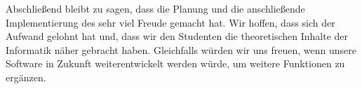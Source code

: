Abschließend bleibt zu sagen, dass die Planung und die anschließende
Implementierung des \gtitools sehr viel Freude gemacht hat. Wir hoffen, dass sich
der Aufwand gelohnt hat und, dass wir den Studenten die theoretischen Inhalte der
Informatik näher gebracht haben. Gleichfalls würden wir uns freuen, wenn unsere
Software in Zukunft weiterentwickelt werden würde, um weitere Funktionen zu
ergänzen.\vspace{10pt}



